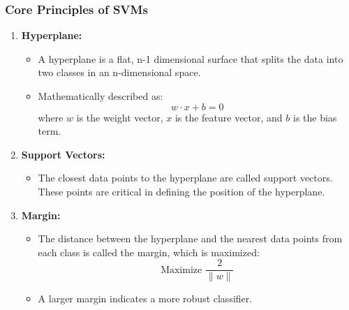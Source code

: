 \documentclass[aspectratio=169]{beamer}
\begin{document}
\begin{frame}[fragile]
    \frametitle{Core Principles of SVMs}
    \begin{enumerate}
        \item \textbf{Hyperplane:} 
            \begin{itemize}
                \item A hyperplane is a flat, n-1 dimensional surface that splits the data into two classes in an n-dimensional space.
                \item Mathematically described as:
                \begin{equation}
                    w \cdot x + b = 0
                \end{equation}
                where \(w\) is the weight vector, \(x\) is the feature vector, and \(b\) is the bias term.
            \end{itemize}
        \item \textbf{Support Vectors:} 
            \begin{itemize}
                \item The closest data points to the hyperplane are called support vectors. These points are critical in defining the position of the hyperplane.
            \end{itemize}
        \item \textbf{Margin:} 
            \begin{itemize}
                \item The distance between the hyperplane and the nearest data points from each class is called the margin, which is maximized:
                \begin{equation}
                    \text{Maximize } \frac{2}{\|w\|}
                \end{equation}
                \item A larger margin indicates a more robust classifier.
            \end{itemize}
    \end{enumerate}
\end{frame}
\end{document}
